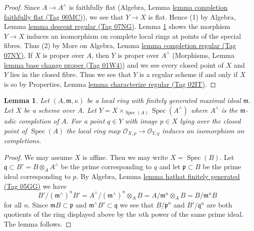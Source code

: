 \documentclass{amsart}
\theoremstyle{plain}
\newtheorem{lemma}[subsection]{Lemma}
\theoremstyle{definition}
\theoremstyle{remark}
\numberwithin{equation}{subsection}
\def\Spec{\mathop{\mathrm{Spec}}}
\begin{document}
\begin{proof}
Since $A \to A^\wedge$ is faithfully flat
(Algebra, Lemma \href{https://stacks.math.columbia.edu/tag/00MC}{lemma completion faithfully flat (Tag 00MC)}),
we see that $Y \to X$ is flat. Hence (1) by
Algebra, Lemma \href{https://stacks.math.columbia.edu/tag/07NG}{lemma descent regular (Tag 07NG)}.
Lemma \ref{resolve-lemma-iso-completions} shows the morphism $Y \to X$
induces an isomorphism on complete local rings at points
of the special fibres. Thus (2) by
More on Algebra, Lemma \href{https://stacks.math.columbia.edu/tag/07NY}{lemma completion regular (Tag 07NY)}.
If $X$ is proper over $A$, then $Y$ is proper over $A^\wedge$
(Morphisms, Lemma \href{https://stacks.math.columbia.edu/tag/01W4}{lemma base change proper (Tag 01W4)})
and we see every closed point of $X$ and $Y$ lies in the closed fibre.
Thus we see that $Y$ is a regular scheme if and only if $X$ is so by
Properties, Lemma \href{https://stacks.math.columbia.edu/tag/02IT}{lemma characterize regular (Tag 02IT)}.
\end{proof}


\begin{lemma}
\label{resolve-lemma-iso-completions}
Let $(A, \mathfrak m, \kappa)$ be a local ring with finitely generated
maximal ideal $\mathfrak m$. Let $X$ be a scheme over $A$.
Let $Y = X \times_{\Spec(A)} \Spec(A^\wedge)$ where
$A^\wedge$ is the $\mathfrak m$-adic completion of $A$.
For a point $q \in Y$ with image $p \in X$ lying
over the closed point of $\Spec(A)$ the
local ring map $\mathcal{O}_{X, p} \to \mathcal{O}_{Y, q}$
induces an isomorphism on completions.
\end{lemma}

\begin{proof}
We may assume $X$ is affine. Then we may write $X = \Spec(B)$.
Let $\mathfrak q \subset B' = B \otimes_A A^\wedge$ be the
prime corresponding to $q$ and let $\mathfrak p \subset B$
be the prime ideal corresponding to $p$.
By Algebra, Lemma \href{https://stacks.math.columbia.edu/tag/05GG}{lemma hathat finitely generated (Tag 05GG)}
we have
$$
B'/(\mathfrak m^\wedge)^n B' =
A^\wedge/(\mathfrak m^\wedge)^n \otimes_A B =
A/\mathfrak m^n \otimes_A B = B/\mathfrak m^n B
$$
for all $n$. Since $\mathfrak m B \subset \mathfrak p$ and
$\mathfrak m^\wedge B' \subset \mathfrak q$ we see that
$B/\mathfrak p^n$ and $B'/\mathfrak q^n$ are both
quotients of the ring displayed above by the $n$th power
of the same prime ideal. The lemma follows.
\end{proof}
\end{document}
